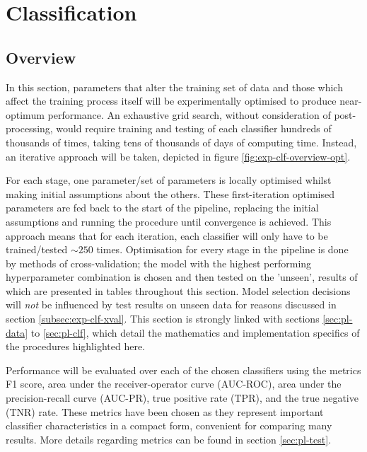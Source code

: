 \section{Classification}
\label{sec:exp-clf}
    \subsection{Overview}
    \label{subsec:exp-clf-overview}
        In this section, parameters that alter the training set of data and those which affect the training process itself will be experimentally optimised to produce near-optimum performance. An exhaustive grid search, without consideration of post-processing, would require training and testing of each classifier hundreds of thousands of times, taking tens of thousands of days of computing time. Instead, an iterative approach will be taken, depicted in figure \ref{fig:exp-clf-overview-opt}. 
        
        For each stage, one parameter/set of parameters is locally optimised whilst making initial assumptions about the others. These first-iteration optimised parameters are fed back to the start of the pipeline, replacing the initial assumptions and running the procedure until convergence is achieved. This approach means that for each iteration, each classifier will only have to be trained/tested $\sim250$ times. Optimisation for every stage in the pipeline is done by methods of cross-validation; the model with the highest performing hyperparameter combination is chosen and then tested on the 'unseen', results of which are presented in tables throughout this section. Model selection decisions will \textit{not} be influenced by test results on unseen data for reasons discussed in section \ref{subsec:exp-clf-xval}. This section is strongly linked with sections \ref{sec:pl-data} to \ref{sec:pl-clf}, which detail the mathematics and implementation specifics of the procedures highlighted here.
        
        Performance will be evaluated over each of the chosen classifiers using the metrics F1 score, area under the receiver-operator curve (AUC-ROC), area under the precision-recall curve (AUC-PR), true positive rate (TPR), and the true negative (TNR) rate. These metrics have been chosen as they represent important classifier characteristics in a compact form, convenient for comparing many results. More details regarding metrics can be found in section \ref{sec:pl-test}. 

